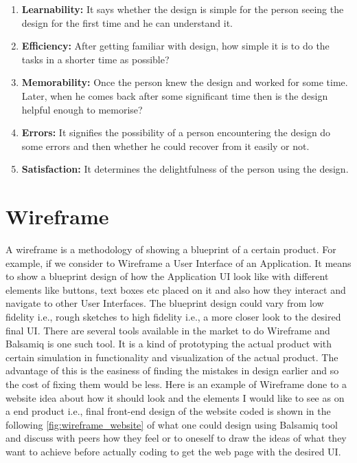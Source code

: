 \begin{enumerate}
\item \textbf{Learnability:}  It says whether the design is simple for the person seeing the design for the first time and he can understand it.
\item \textbf{Efficiency:}  After getting familiar with design, how simple it is to do the tasks in a shorter time as possible?
\item \textbf{Memorability:} Once the person knew the design and worked for some time. Later, when he comes back after some significant time then is the design helpful enough to memorise?
\item \textbf{Errors:} It signifies the possibility of a person encountering the design do some errors and then whether he could recover from it easily or not.
\item \textbf{Satisfaction:} It determines the delightfulness of the person using the design.
\end{enumerate}

\section{Wireframe}

A wireframe is a methodology of showing a blueprint of a certain product. For example, if we consider to Wireframe a User Interface of an Application. It means to show a blueprint design of how the Application UI look like with different elements like buttons, text boxes etc placed on it and also how they interact and navigate to other User Interfaces. The blueprint design could vary from low fidelity i.e., rough sketches to high fidelity i.e., a more closer look to the desired final UI. There are several tools available in the market to do Wireframe and Balsamiq \cite{B} is one such tool. It is a kind of prototyping the actual product with certain simulation in functionality and visualization of the actual product. The advantage of this is the easiness of finding the mistakes in design earlier and so the cost of fixing them would be less. Here is an example of Wireframe done to a website idea about how it should look and the elements I would like to see as on a end product i.e., final front-end  design of the website coded is shown in the following \autoref{fig:wireframe_website} of what one could design using Balsamiq tool and discuss with peers how they feel or to oneself to draw the ideas of what they want to achieve before actually coding to get the web page with the desired UI. \\ \\

